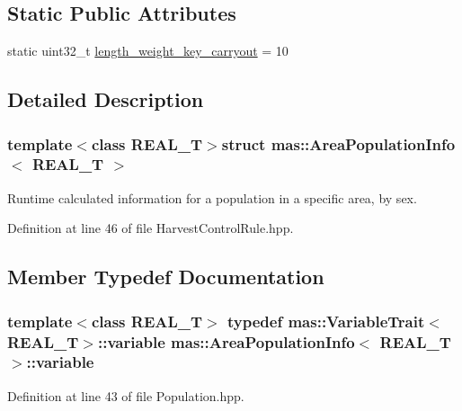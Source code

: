 \subsection*{Static Public Attributes}
\begin{DoxyCompactItemize}
\item 
static uint32\-\_\-t \hyperlink{structmas_1_1_area_population_info_af68d37d923cc8de6d425900490f6e105}{length\-\_\-weight\-\_\-key\-\_\-carryout} = 10
\end{DoxyCompactItemize}


\subsection{Detailed Description}
\subsubsection*{template$<$class R\-E\-A\-L\-\_\-\-T$>$struct mas\-::\-Area\-Population\-Info$<$ R\-E\-A\-L\-\_\-\-T $>$}

Runtime calculated information for a population in a specific area, by sex. 

Definition at line 46 of file Harvest\-Control\-Rule.\-hpp.



\subsection{Member Typedef Documentation}
\hypertarget{structmas_1_1_area_population_info_a154b6c5cf71d1241e90b0f0173dbe32c}{
\subsubsection[{variable}]{\setlength{\rightskip}{0pt plus 5cm}template$<$class R\-E\-A\-L\-\_\-\-T$>$ typedef {\bf mas\-::\-Variable\-Trait}$<$R\-E\-A\-L\-\_\-\-T$>$\-::{\bf variable} {\bf mas\-::\-Area\-Population\-Info}$<$ R\-E\-A\-L\-\_\-\-T $>$\-::{\bf variable}}}\label{structmas_1_1_area_population_info_a154b6c5cf71d1241e90b0f0173dbe32c}


Definition at line 43 of file Population.\-hpp.



